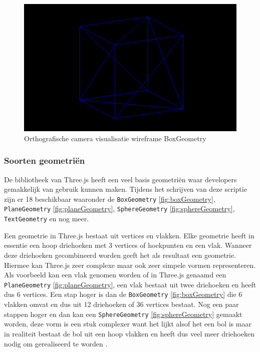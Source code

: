 \begin{figure}
	\centering
	\includegraphics[width=1\linewidth]{graphics/orthografischeCamera}
	\caption[Orthografische camera visualisatie]{Orthografische camera visualisatie wireframe BoxGeometry}
	\label{fig:orthografischeCamera}
\end{figure}
\newpage
\subsubsection{Soorten geometriën}

De bibliotheek van Three.js heeft een veel basis geometriën waar developers gemakkelijk van gebruik kunnen maken. Tijdens het schrijven van deze scriptie zijn er 18 beschikbaar waaronder de \texttt{BoxGeometry} \ref{fig:boxGeometry}, \texttt{PlaneGeometry} \ref{fig:planeGeometry}, \texttt{SphereGeometry} \ref{fig:sphereGeometry}, \texttt{TextGeometry} en nog meer.

Een geometrie in Three.js bestaat uit vertices en vlakken. Elke geometrie heeft in essentie een hoop driehoeken met 3 vertices of hoekpunten en een vlak. Wanneer deze driehoeken gecombineerd worden geeft het als resultaat een geometrie. Hiermee kan Three.js zeer complexe maar ook zeer simpele vormen representeren. Als voorbeeld kan een vlak genomen worden of in Three.js genaamd een \texttt{PlaneGeometry} \ref{fig:planeGeometry}, een vlak bestaat uit twee driehoeken en heeft dus 6 vertices. Een stap hoger is dan de \texttt{BoxGeometry} \ref{fig:boxGeometry} die 6 vlakken omvat en dus uit 12 driehoeken of 36 vertices bestaat. Nog een paar stappen hoger en dan kan een \texttt{SphereGeometry} \ref{fig:sphereGeometry} gemaakt worden, deze vorm is een stuk complexer want het lijkt alsof het een bol is maar in realiteit bestaat de bol uit een hoop vlakken en heeft dus veel meer driehoeken nodig om gerealiseerd te worden \autocite{threejs2023}.

